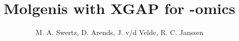 \documentclass[11pt]{article}
\begin{document}
\title{Molgenis with XGAP for -omics}
\author{M. A. Swertz, D. Arends, J. v/d Velde, R. C. Janssen}
\renewcommand{\today}{April 9, 2009}
\maketitle








\end{document}
